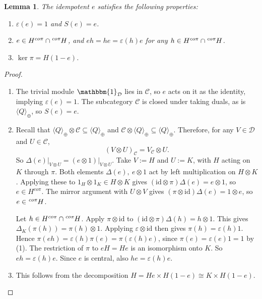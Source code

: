\documentclass{amsart}
\theoremstyle{plain}%
\newtheorem{lemma}{Lemma}[subsection]
\theoremstyle{remark}
\newcommand{\1}{\mathbbm{1}}
\newcommand{\D}{\mathcal{D}}
\newcommand{\prescr}[2]{\tensor*[^{#1}]{#2}{}}
\begin{document}
\begin{lemma}\label{lem:properties_of_e}
    The idempotent $e$ satisfies the following properties: 
    \begin{enumerate}
              \item $\varepsilon(e)=1$ and $S(e)=e$.  
              \item $e\in H^{co \pi} \cap \prescr{co\pi}{H}$, and $eh=he=\varepsilon(h)e$ for any $h\in  H^{co \pi} \cap \prescr{co\pi}{H}$.
\item $\ker\pi=H(1-e)$.
    \end{enumerate}
\end{lemma}
\begin{proof}
\mbox{}
\begin{enumerate}
\item The trivial module $\1_\D$ lies in $\mathcal{C}$, so $e$ acts on it as the identity, implying $\varepsilon(e)=1$. The subcategory $\mathcal{C}$ is closed under taking duals, as is $\langle Q\rangle_{\oplus}$, so $S(e)=e$.
        \item
Recall that $\langle Q\rangle_{\oplus}\otimes\mathcal{C}\subseteq\langle Q\rangle_{\oplus}$ and $\mathcal{C}\otimes\langle Q\rangle_{\oplus}\subseteq\langle Q\rangle_{\oplus}$.
Therefore, for any $V\in\mathcal{D}$ and $U\in \mathcal{C}$, $$(V\otimes U)_{\mathcal{C}}=V_{\mathcal{C}}\otimes U.$$
So $\Delta(e) \rvert_{V\otimes U}=(e\otimes1) \rvert_{V\otimes U}$. 
Take $V:=H$ and $U:=K$, with $H$ acting on $\mathit{K}$ through $\pi$. Both elements $\Delta(e),~ e\otimes 1$ act by left multiplication on $H\otimes K$. Applying these to $1_H\otimes1_K \in H\otimes K$ gives $(\mathrm{id}\otimes\pi)\Delta(e)=e\otimes1$, so $e\in H^{co \pi}$. 
The mirror argument with $U\otimes V$ gives $(\pi\otimes\mathrm{id})\Delta(e)=1\otimes e$, so $e\in  \prescr{co\pi}{H}$.




Let $h\in H^{co \pi} \cap \prescr{co\pi}{H}$. Apply $\pi\otimes\mathrm{id}$ to $(\mathrm{id}\otimes\pi)\Delta(h)=h\otimes1$. This gives $\Delta_K(\pi(h))=\pi(h)\otimes1$.
Applying $\varepsilon\otimes\mathrm{id}$ then gives $\pi(h)=\varepsilon(h)1$.
Hence $\pi(eh)=\varepsilon(h)\pi(e)=\pi(\varepsilon(h)e)$, since $\pi(e)=\varepsilon(e)1=1$ by (1).
The restriction of $\pi$ to $eH=He$ is an isomorphism onto $\mathit{K}$. So $eh=\varepsilon(h)e$. Since $\mathit{e}$ is central, also $he=\varepsilon(h)e$.


       \item This follows from the decomposition $H=He\times H(1-e) \cong K\times H(1-e)$.
       
    \end{enumerate}
\end{proof}
\end{document}
